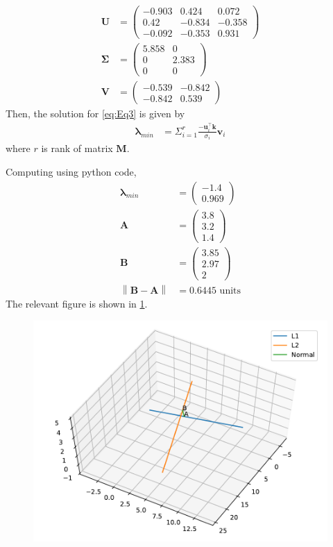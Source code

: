 \documentclass[12pt]{article}
\providecommand{\norm}[1]{\left\lVert#1\right\rVert}
\newcommand{\myvec}[1]{\ensuremath{\begin{pmatrix}#1\end{pmatrix}}}
\let\vec\mathbf
\begin{document}
\begin{enumerate}
\begin{align}
	\vec{U} &= \myvec{-0.903 & 0.424 & 0.072 \\
	                  0.42 & -0.834 & -0.358 \\
			  -0.092 &-0.353& 0.931} \\
	\vec{\Sigma} &= \myvec{5.858 & 0 \\
	                      0 & 2.383 \\
			      0 & 0 } \\
	 \vec{V} &= \myvec{ -0.539 & -0.842 \\
	                    -0.842 & 0.539}
\end{align}
Then, the solution for \eqref{eq:Eq3} is given by
\begin{align}
	\label{eq:Eq4}
	\bm{\lambda}_{min} &= \Sigma_{i=1}^r\frac{-\vec{u}_i^\top\vec{k}}{\sigma_i}\vec{v}_i
\end{align}
where $r$ is rank of matrix $\vec{M}$.

Computing using python code,
\begin{align}
	\bm{\lambda}_{min} &=  \myvec{-1.4 \\ 0.969} \\ 
	\vec{A} &= \myvec{3.8\\3.2\\ 1.4}\\
	\vec{B} &= \myvec{3.85\\2.97\\ 2}\\
	\norm{\vec{B}-\vec{A}} &= 0.6445 \text{ units}
\end{align}
The relevant figure is shown in \ref{fig:Fig1}. 
\begin{figure}[!h]
	\begin{center}
		\includegraphics[width=\columnwidth]{figs/problem30.pdf}
	\end{center}
\caption{}
\label{fig:Fig1}
\end{figure}
\end{enumerate}
\end{document}
